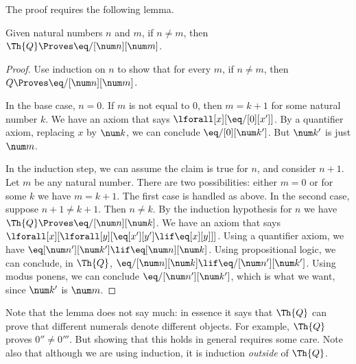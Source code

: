 \documentclass[../../../include/open-logic-section]{subfiles}
\begin{document}
The proof requires the following lemma.

\begin{lem}
 Given natural numbers $n$ and $m$, if $n
\neq m$, then $\Th{Q} \Proves \eq/[\num n][\num m]$.
\end{lem}

\begin{proof}
Use induction on $n$ to show that for every $m$, if $n \neq m$, then
$Q \Proves \eq/[\num n][\num m]$.

In the base case, $n = 0$. If $m$ is not equal to $0$, then $m = k +
1$ for some natural number $k$. We have an axiom that says
$\lforall[x][\eq/[0][x']]$. By a quantifier axiom, replacing $x$ by
  $\num k$, we can conclude $\eq/[0][\num k']$. But $\num k'$ is just
  $\num m$.

In the induction step, we can assume the claim is true for $n$, and
consider $n+1$. Let $m$ be any natural number. There are two
possibilities: either $m = 0$ or for some $k$ we have $m = k+1$. The
first case is handled as above. In the second case, suppose $n+1 \neq
k+1$. Then $n \neq k$. By the induction hypothesis for $n$ we have
$\Th{Q} \Proves \eq/[\num n][\num k]$. We have an axiom that says
$\lforall[x][\lforall[y][\eq[x'][y'] \lif \eq[x][y]]]$. Using a
quantifier axiom, we have $\eq[\num n'][\num k'] \lif \eq[\num n][\num
  k]$. Using propositional logic, we can conclude, in $\Th{Q}$,
$\eq/[\num n][\num k] \lif \eq/[\num n'][\num k']$. Using modus
ponens, we can conclude $\eq/[\num n'][\num k']$, which is what we want,
since $\num k'$ is $\num m$.
\end{proof}

\begin{explain}
Note that the lemma does not say much: in essence it says that $\Th{Q}$ can
prove that different numerals denote different objects. For example,
$\Th{Q}$ proves $0'' \neq 0'''$. But showing that this holds in general
requires some care. Note also that although we are using induction, it
is induction \emph{outside} of $\Th{Q}$.
\end{explain}
\end{document}
